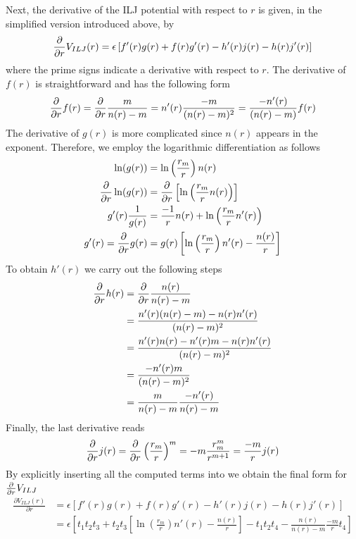 \documentclass[utf8]{article}
\begin{document}
%
Next, the derivative of the ILJ potential with respect to $r$ is given, in the simplified
version introduced above, by
%
\begin{equation}\label{eq:dVdr_ILJ_simple}
    \frac{\partial}{\partial r} V_{ILJ}(r) = \epsilon \left[ f'(r)g(r) + f(r)g'(r) -
                                      h'(r)j(r) - h(r)j'(r) \right]
\end{equation}
%
where the prime signs indicate a derivative with respect to $r$.
The derivative of $f(r)$ is straightforward and has the following form
%
\begin{equation}
    \frac{\partial}{\partial r} f(r) = \frac{\partial}{\partial r}\frac{m}{n(r)-m} = n'(r)\frac{-m}{(n(r)-m)^2} = \frac{-n'(r)}{(n(r)-m)}f(r)
\end{equation}
%
The derivative of $g(r)$ is more complicated since $n(r)$ appears in the exponent. Therefore,
we employ the logarithmic differentiation as follows
%
\begin{align}
    \ln (g(r)) &= \ln \left( \frac{r_m}{r} \right) n(r) \\
    \frac{\partial}{\partial r} \ln (g(r)) &= \frac{\partial}{\partial r} \left[ \ln \left( \frac{r_m}{r}n(r) \right) \right] \\
    g'(r) \frac{1}{g(r)} &= \frac{-1}{r}n(r) + \ln \left( \frac{r_m}{r}n'(r) \right) \\
    g'(r) = \frac{\partial}{\partial r} g(r) &= g(r)\left[\ln\left(\frac{r_m}{r}\right)n'(r) - \frac{n(r)}{r}\right]
\end{align}
To obtain $h'(r)$ we carry out the following steps
%
\begin{align}
    \frac{\partial}{\partial r} h(r) &= \frac{\partial}{\partial r} \frac{n(r)}{n(r)-m} \\
    &= \frac{n'(r)(n(r)-m)-n(r)n'(r)}{(n(r)-m)^2} \\
    &= \frac{n'(r)n(r) - n'(r)m - n(r)n'(r)}{(n(r)-m)^2} \\
    &= \frac{-n'(r)m}{(n(r)-m)^2} \\
    &= \frac{m}{n(r)-m} \frac{-n'(r)}{n(r)-m}
\end{align}
%
Finally, the last derivative reads
%
\begin{equation}
    \frac{\partial}{\partial r} j(r) = \frac{\partial}{\partial r} \left(\frac{r_m}{r}\right)^m = -m\frac{r_m^m}{r^{m+1}} = \frac{-m}{r}j(r)
\end{equation}
%
By explicitly inserting all the computed terms into  we obtain
the final form for $\frac{\partial}{\partial r} V_{ILJ}$
%
\begin{align}
    \frac{\partial V_{ILJ}(r)}{\partial r} &= \epsilon
        \left[ f'(r)g(r) + f(r)g'(r) - h'(r)j(r) - h(r)j'(r) \right] \\
    &= \epsilon \left[ 
        t_1 t_2 t_3
        + t_2 t_3 \left[ \ln \left(\frac{r_m}{r}\right)n'(r) - \frac{n(r)}{r} \right]
        - t_1 t_2 t_4
        - \frac{n(r)}{n(r)-m} \frac{-m}{r} t_4 \right]
\end{align}
\end{document}
